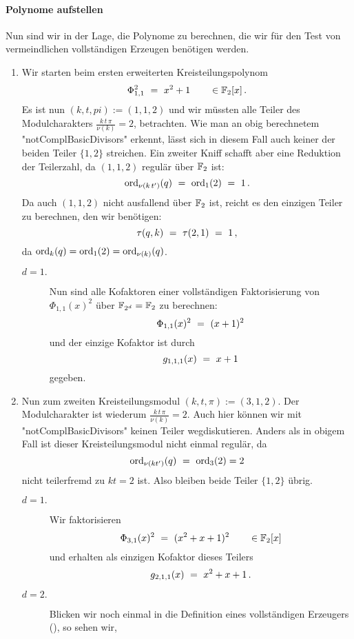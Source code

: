 \paragraph{Polynome aufstellen} Nun sind wir in der Lage, die Polynome zu
berechnen, die wir für den Test von vermeindlichen vollständigen Erzeugen
benötigen werden. 
\begin{enumerate}
  \item Wir starten beim ersten erweiterten Kreisteilungspolynom
    \[ \Phi_{1,1}^2 \ =\  x^2 + 1 \qquad \in \mathbb{F}_2[x]\,. \]
    Es ist nun $(k,t,pi) := (1,1,2)$ und wir 
    müssten alle Teiler des Modulcharakters $\frac{k\,t\,\pi}{\nu(k)} = 2$,
    betrachten. Wie man an obig berechnetem "notComplBasicDivisors" erkennt, 
    lässt sich in diesem Fall auch keiner der beiden Teiler $\{1,2\}$
    streichen. Ein zweiter Kniff schafft aber eine Reduktion der Teilerzahl, da 
    $(1,1,2)$ regulär über $\mathbb{F}_2$ ist:
    \[ \operatorname{ord}_{\nu(k\,t')}(q) \ =\  \operatorname{ord}_{1}(2) \ =\  1 \,. \]
    Da auch $(1,1,2)$ nicht ausfallend über $\mathbb{F}_2$ ist, reicht es den einzigen
    Teiler zu berechnen, den wir benötigen:
    \[ \tau(q,k) \ =\  \tau(2,1) \ =\  1\,,\]
    da $\operatorname{ord}_k(q) = \operatorname{ord}_1(2) = \operatorname{ord}_{\nu(k)}(q)$.
    \begin{description}
      \item[$d=1.$] Nun sind alle Kofaktoren einer vollständigen Faktorisierung
        von $\Phi_{1,1}(x)^2$ über $\mathbb{F}_{2^d} = \mathbb{F}_2$ zu berechnen:
        \[ \Phi_{1,1}(x)^2 \ =\  (x+1)^2\]
        und der einzige Kofaktor ist durch
        \[ g_{1,1,1}(x) \ =\  x+1 \]
        gegeben.
    \end{description}
  \item Nun zum zweiten Kreisteilungsmodul $(k,t,\pi) := (3,1,2)$. Der
    Modulcharakter ist wiederum $\frac{k\,t\,\pi}{\nu(k)} = 2$. Auch hier
    können wir mit "notComplBasicDivisors" keinen Teiler wegdiskutieren. Anders
    als in obigem Fall ist dieser Kreisteilungsmodul nicht einmal regulär, da 
    \[ \operatorname{ord}_{\nu(kt')}(q) \ =\  \operatorname{ord}_3(2) = 2\]
    nicht teilerfremd zu $kt=2$ ist.
    Also bleiben beide Teiler $\{1,2\}$ übrig.
    \begin{description}
      \item[$d=1.$] Wir faktorisieren 
        \[ \Phi_{3,1}(x)^2 \ =\  (x^2+x+1)^2 \qquad \in \mathbb{F}_2[x] \]
        und erhalten als einzigen Kofaktor dieses Teilers
        \[ g_{2,1,1}(x) \ =\  x^2+x+1\,.\]
      \item[$d=2.$] Blicken wir noch einmal in die Definition eines
        vollständigen Erzeugers (), so sehen wir,

\end{description}
\end{enumerate}
